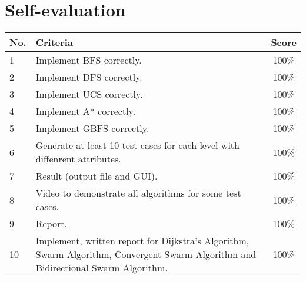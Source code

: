 \pagebreak
\section{Self-evaluation}
\begin{center}
  \renewcommand{\arraystretch}{1.5}
  \begin{tabular}{|l|p{}|c|}
    \hline
    \textbf{No.} & \textbf{Criteria}           & \textbf{Score} \\ \hline
    1            & Implement BFS correctly.             & 100\%          \\ \hline
    2            & Implement DFS correctly.         & 100\%          \\ \hline
    3            & Implement UCS correctly. & 100\%          \\ \hline
    4            & Implement A* correctly.    & 100\%          \\ \hline
	5			 & Implement GBFS correctly.    & 100\%          \\ \hline
    6            & Generate at least 10 test cases for each level with diffenrent attributes.             & 100\%          \\ \hline
    7            & Result (output file and GUI).                & 100\%          \\ \hline
    8            & Video to demonstrate all algorithms for some test cases.                   & 100\%          \\ \hline
	9            & Report.                    & 100\%          \\ \hline
	10			 & Implement, written report for Dijkstra's Algorithm, Swarm Algorithm, Convergent Swarm Algorithm and Bidirectional Swarm Algorithm.              & 100\%          \\ \hline
  \end{tabular}
\end{center}
